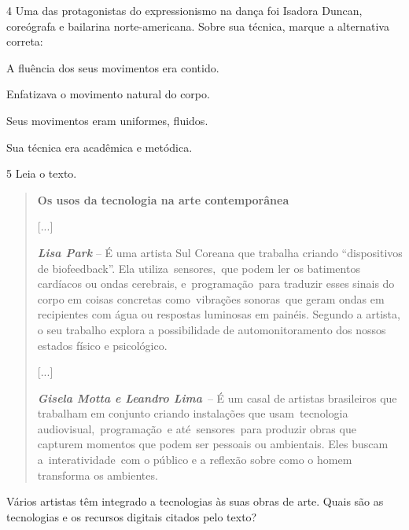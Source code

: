 \begin{escolha}
\num{4} Uma das protagonistas do expressionismo na dança foi Isadora Duncan,
coreógrafa e bailarina norte-americana. Sobre sua técnica, marque a
alternativa correta:

\begin{boxlist}
\item A fluência dos seus movimentos era contido.

\item Enfatizava o movimento natural do corpo. 

\item Seus movimentos eram uniformes, fluidos.

\item Sua técnica era acadêmica e metódica.
\end{boxlist}


\num{5} Leia o texto.

\begin{quote}
\textbf{Os usos da tecnologia na arte contemporânea}

{[}...{]}

\emph{\textbf{Lisa Park}} -- É uma artista Sul Coreana que trabalha
criando ``dispositivos de biofeedback''. Ela utiliza~sensores,~que podem
ler os batimentos cardíacos ou ondas cerebrais, e~programação~para
traduzir esses sinais do corpo em coisas concretas como~vibrações
sonoras~que geram ondas em recipientes com água ou respostas luminosas
em painéis. Segundo a artista, o seu trabalho explora a possibilidade de
automonitoramento dos nossos estados físico e psicológico.

{[}...{]}

\emph{\textbf{Gisela Motta e Leandro Lima}}~-- É um casal de artistas
brasileiros que trabalham em conjunto criando instalações que
usam~tecnologia audiovisual,~programação~e até~sensores~para produzir
obras que capturem momentos que podem ser pessoais ou ambientais. Eles
buscam a~interatividade~com o público e a reflexão sobre como o homem
transforma os ambientes.

\end{quote}

Vários artistas têm integrado a tecnologias às suas obras de arte. Quais
são as tecnologias e os recursos digitais citados pelo texto?


\end{escolha}
